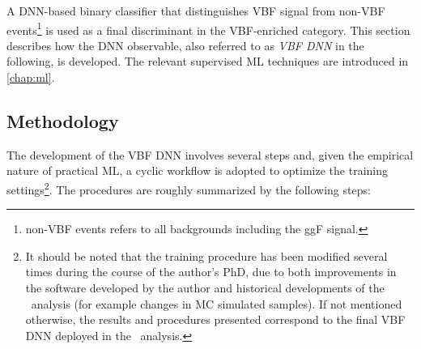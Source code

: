 A DNN-based binary classifier that distinguishes VBF signal from non-VBF events\footnote{non-VBF events refers to all backgrounds including the ggF signal.} is used as a final discriminant in the VBF-enriched \TwoJet category.
This section describes how the DNN observable, also referred to as \emph{VBF DNN} in the following, is developed.
The relevant supervised ML techniques are introduced in \cref{chap:ml}.

\subsection{Methodology}
The development of the VBF DNN involves several steps and, given the empirical nature of practical ML, a cyclic workflow is adopted to optimize the training settings\footnote{It should be noted that the training procedure has been modified several times during the course of the author's PhD, due to both improvements in the software developed by the author and historical developments of the \HWW\ analysis (for example changes in MC simulated samples). If not mentioned otherwise, the results and procedures presented correspond to the final VBF DNN deployed in the \HWW\ analysis.}.
The procedures are roughly summarized by the following steps:

